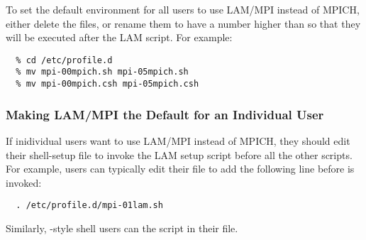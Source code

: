 To set the default environment for all users to use LAM/MPI instead of
MPICH, either delete the  files, or rename them to
have a number higher than  so that they will be executed
after the LAM script.  For example:

\begin{verbatim}
  % cd /etc/profile.d
  % mv mpi-00mpich.sh mpi-05mpich.sh
  % mv mpi-00mpich.csh mpi-05mpich.csh
\end{verbatim}

\subsubsection{Making LAM/MPI the Default for an Individual User}

If inidividual users want to use LAM/MPI instead of MPICH, they should
edit their shell-setup file to invoke the LAM  setup
script before all the other  scripts.  For
example,  users can typically edit their  file
to add the following line before  is invoked:

\begin{verbatim}
  . /etc/profile.d/mpi-01lam.sh
\end{verbatim}

Similarly, -style shell users can  the
 script in their  file.



